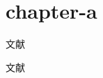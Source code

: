 \chapter{chapter-a}

\begin{refsection}


文献\citet{buseck,wfz}

文献\citep{walls,sommers,deverell}

%




\end{refsection}

